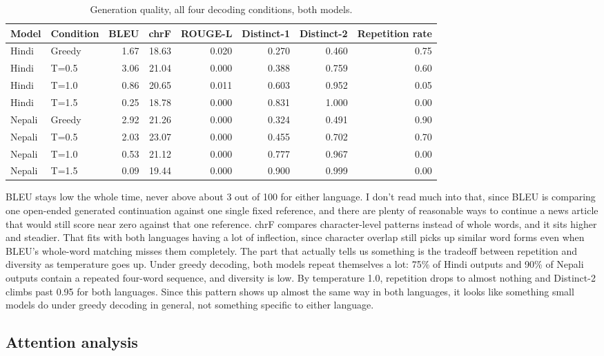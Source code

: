 \documentclass[10pt]{article}
\begin{document}
\begin{table}[h]
\centering
\small
\begin{tabular}{llrrrrrr}
\toprule
Model & Condition & BLEU & chrF & ROUGE-L & Distinct-1 & Distinct-2 & Repetition rate \\
\midrule
Hindi & Greedy & 1.67 & 18.63 & 0.020 & 0.270 & 0.460 & 0.75 \\
Hindi & T=0.5 & 3.06 & 21.04 & 0.000 & 0.388 & 0.759 & 0.60 \\
Hindi & T=1.0 & 0.86 & 20.65 & 0.011 & 0.603 & 0.952 & 0.05 \\
Hindi & T=1.5 & 0.25 & 18.78 & 0.000 & 0.831 & 1.000 & 0.00 \\
\addlinespace
Nepali & Greedy & 2.92 & 21.26 & 0.000 & 0.324 & 0.491 & 0.90 \\
Nepali & T=0.5 & 2.03 & 23.07 & 0.000 & 0.455 & 0.702 & 0.70 \\
Nepali & T=1.0 & 0.53 & 21.12 & 0.000 & 0.777 & 0.967 & 0.00 \\
Nepali & T=1.5 & 0.09 & 19.44 & 0.000 & 0.900 & 0.999 & 0.00 \\
\bottomrule
\end{tabular}
\caption{Generation quality, all four decoding conditions, both models.}
\end{table}

BLEU stays low the whole time, never above about 3 out of 100 for either language. I don't read much into that, since BLEU is comparing one open-ended generated continuation against one single fixed reference, and there are plenty of reasonable ways to continue a news article that would still score near zero against that one reference. chrF compares character-level patterns instead of whole words, and it sits higher and steadier. That fits with both languages having a lot of inflection, since character overlap still picks up similar word forms even when BLEU's whole-word matching misses them completely. The part that actually tells us something is the tradeoff between repetition and diversity as temperature goes up. Under greedy decoding, both models repeat themselves a lot: 75\% of Hindi outputs and 90\% of Nepali outputs contain a repeated four-word sequence, and diversity is low. By temperature 1.0, repetition drops to almost nothing and Distinct-2 climbs past 0.95 for both languages. Since this pattern shows up almost the same way in both languages, it looks like something small models do under greedy decoding in general, not something specific to either language.

\subsection{Attention analysis}
\end{document}
